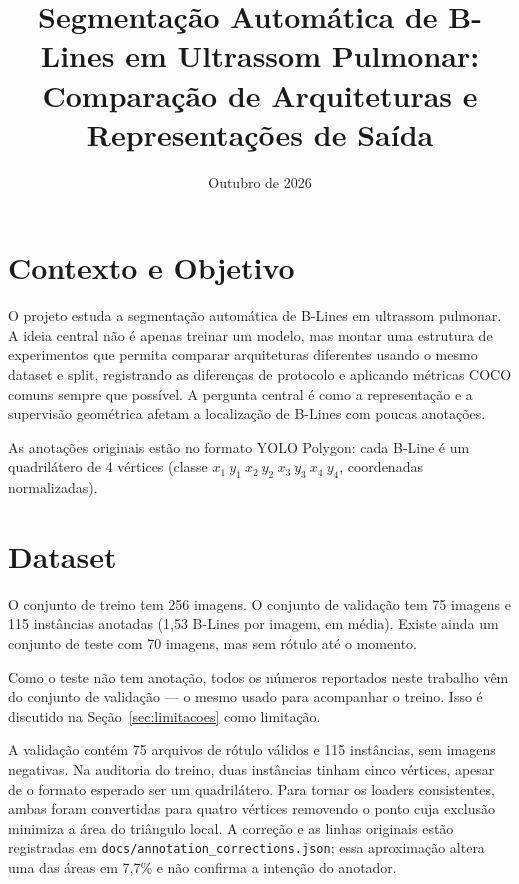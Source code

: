 \documentclass[11pt]{article}
\title{Segmentação Automática de B-Lines em Ultrassom Pulmonar: \\
Comparação de Arquiteturas e Representações de Saída}
\author{}
\date{Outubro de 2026}
\begin{document}
\maketitle

\section{Contexto e Objetivo}

O projeto estuda a segmentação automática de B-Lines em ultrassom pulmonar. A ideia
central não é apenas treinar um modelo, mas montar uma estrutura de experimentos que
permita comparar arquiteturas diferentes usando o mesmo dataset e split, registrando
as diferenças de protocolo e aplicando métricas COCO comuns sempre que possível. A
pergunta central é como a representação e a supervisão geométrica afetam a
localização de B-Lines com poucas anotações.

As anotações originais estão no formato YOLO Polygon: cada B-Line é um quadrilátero
de 4 vértices (classe $x_1\ y_1\ x_2\ y_2\ x_3\ y_3\ x_4\ y_4$, coordenadas
normalizadas).

\section{Dataset}

O conjunto de treino tem 256 imagens. O conjunto de validação tem 75 imagens e 115
instâncias anotadas (1,53 B-Lines por imagem, em média). Existe ainda um conjunto de
teste com 70 imagens, mas sem rótulo até o momento.

Como o teste não tem anotação, todos os números reportados neste trabalho vêm do
conjunto de validação --- o mesmo usado para acompanhar o treino. Isso é discutido
na Seção~\ref{sec:limitacoes} como limitação.

A validação contém 75 arquivos de rótulo válidos e 115 instâncias, sem imagens
negativas. Na auditoria do treino, duas instâncias tinham cinco vértices, apesar de
o formato esperado ser um quadrilátero. Para tornar os loaders consistentes, ambas
foram convertidas para quatro vértices removendo o ponto cuja exclusão minimiza a
área do triângulo local. A correção e as linhas originais estão registradas em
\texttt{docs/annotation\_corrections.json}; essa aproximação altera uma das áreas
em 7,7\% e não confirma a intenção do anotador.
\end{document}
